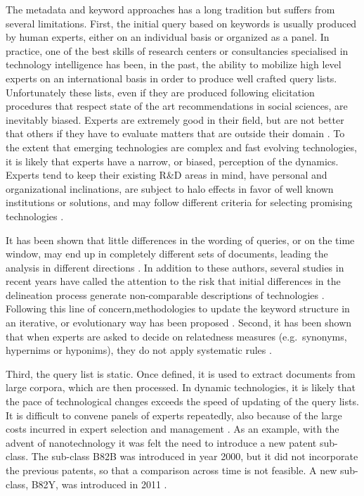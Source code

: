 \documentclass[b5paper,]{book}
\theoremstyle{definition}
\theoremstyle{definition}
\theoremstyle{definition}
\theoremstyle{remark}
\begin{document}
The metadata and keyword approaches has a long tradition but suffers
from several limitations. First, the initial query based on keywords is
usually produced by human experts, either on an individual basis or
organized as a panel. In practice, one of the best skills of research
centers or consultancies specialised in technology intelligence has
been, in the past, the ability to mobilize high level experts on an
international basis in order to produce well crafted query lists.
Unfortunately these lists, even if they are produced following
elicitation procedures that respect state of the art recommendations in
social sciences, are inevitably biased. Experts are extremely good in
their field, but are not better that others if they have to evaluate
matters that are outside their domain \citep{burgman2015trusting}. To
the extent that emerging technologies are complex and fast evolving
technologies, it is likely that experts have a narrow, or biased,
perception of the dynamics. Experts tend to keep their existing R\&D
areas in mind, have personal and organizational inclinations, are
subject to halo effects in favor of well known institutions or
solutions, and may follow different criteria for selecting promising
technologies \citep{kim2017novel}.

It has been shown that little differences in the wording of queries, or
on the time window, may end up in completely different sets of
documents, leading the analysis in different directions
\citep{bassecoulard2007mapping}. In addition to these authors, several
studies in recent years have called the attention to the risk that
initial differences in the delineation process generate non-comparable
descriptions of technologies
\citep{mogoutov2007data, youtie2008nanotechnology, ghazinoory2013application}.
Following this line of concern,methodologies to update the keyword
structure in an iterative, or evolutionary way has been proposed
\citep{mogoutov2007data}. Second, it has been shown that when experts
are asked to decide on relatedness measures (e.g.~synonyms, hypernims or
hyponims), they do not apply systematic rules
\citep{tseng2007text, noh2015keyword}.

Third, the query list is static. Once defined, it is used to extract
documents from large corpora, which are then processed. In dynamic
technologies, it is likely that the pace of technological changes
exceeds the speed of updating of the query lists. It is difficult to
convene panels of experts repeatedly, also because of the large costs
incurred in expert selection and management \citep{tseng2007text}. As an
example, with the advent of nanotechnology it was felt the need to
introduce a new patent sub-class. The sub-class B82B was introduced in
year 2000, but it did not incorporate the previous patents, so that a
comparison across time is not feasible. A new sub-class, B82Y, was
introduced in 2011 \citep{kreuchauff2017patent}.
\end{document}
